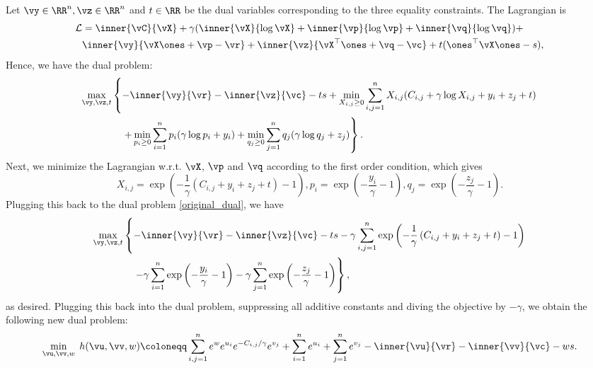 Let $\vy \in \RR^n,\vz \in \RR^n$ and $t \in \RR$ be the dual variables corresponding to the three equality constraints. The Lagrangian is
\begin{align*}
    \mathcal{L} & = \inner{\vC}{\vX} + \gamma (\inner{\vX}{\log \vX} + \inner{\vp}{\log \vp} + \inner{\vq}{\log \vq}) + \\
    &\inner{\vy}{\vX \ones +\vp - \vr} + \inner{\vz}{\vX^\top \ones +\vq - \vc} + t (\ones^\top \vX \ones - s),
\end{align*}
Hence, we have the dual problem:
\begin{align} \label{original_dual}
    \begin{split}
        \max_{\vy, \vz, t} & \left\{ - \inner{\vy}{\vr} - \inner{\vz}{\vc} - ts + \min_{X_{i, j} \geq 0} \sum_{i, j=1}^{n} X_{i, j}(C_{i, j} + \gamma \log X_{i, j} + y_i + z_j + t)\right. \\ 
        & \left. \quad + \min_{p_i \geq 0} \sum_{i=1}^{n} p_i (\gamma \log{p_i} + y_i) + \min_{q_j \geq 0}\sum_{j=1}^{n} q_j (\gamma \log{q_j} + z_j)\right\}.
    \end{split}
\end{align} 
Next, we minimize the Lagrangian w.r.t. $\vX$, $\vp$ and $\vq$ according to the first order condition, which gives
\begin{equation*}
    X_{i, j} = \exp \left( - \frac{1}{\gamma} \left( C_{i, j} + y_i + z_j + t \right) - 1 \right), p_i = \exp \left( - \frac{y_i}{\gamma} - 1 \right), q_j = \exp \left( - \frac{z_j}{\gamma} - 1 \right).
\end{equation*}
Plugging this back to the dual problem \eqref{original_dual}, we have
\begin{align*}
    \begin{split}
        \max_{\vy, \vz, t} & \left\{ - \inner{\vy}{\vr} - \inner{\vz}{\vc} - ts  - \gamma \sum_{i, j=1}^{n} \exp \left( - \frac{1}{\gamma} \left( C_{i, j} + y_i + z_j + t \right) - 1 \right) \right. \\ 
        & \left. \quad - \gamma \sum_{i=1}^{n} \exp \left( - \frac{y_i}{\gamma} - 1 \right) - \gamma \sum_{j=1}^{n} \exp \left( - \frac{z_j}{\gamma} - 1 \right) \right\},
    \end{split}
\end{align*}
as desired.
Plugging this back into the dual problem, suppressing all additive constants and diving the objective by $- \gamma$, we obtain the following new dual problem:
\begin{equation} \label{entropic_regularized_problem}
    \min_{\vu, \vv, w} \; h(\vu,\vv,w) \coloneqq \sum_{i, j=1}^{n} e^{w} e^{u_i} e^{- C_{i, j} / \gamma} e^{v_j} + \sum_{i=1}^{n} e^{u_i} + \sum_{j=1}^{n} e^{v_j} -  \inner{\vu}{\vr} - \inner{\vv}{\vc} - ws.
\end{equation}

